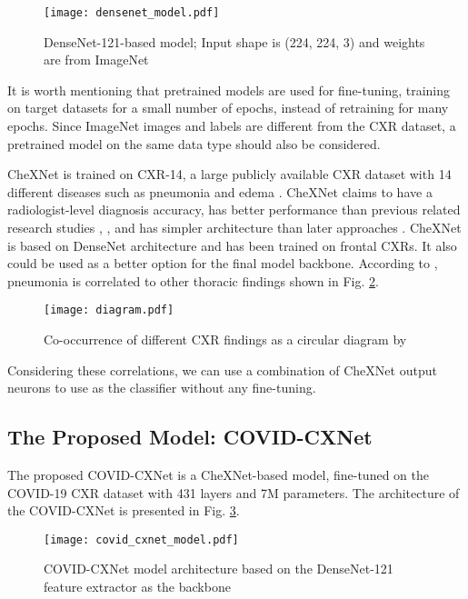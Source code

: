 \documentclass{article}
\begin{document}
\begin{figure}[H]
    \centering
    \texttt{[image: densenet\_model.pdf]}
    \caption{DenseNet-121-based model; Input shape is (224, 224, 3) and weights are from ImageNet}
    \label{fig:densenet}
\end{figure}

\noindent It is worth mentioning that pretrained models are used for fine-tuning, training on target datasets for a small number of epochs, instead of retraining for many epochs. Since ImageNet images and labels are different from the CXR dataset, a pretrained model on the same data type should also be considered.

CheXNet is trained on CXR-14, a large publicly available CXR dataset with 14 different diseases such as pneumonia and edema \cite{rajpurkar2017chexnet}. CheXNet claims to have a radiologist-level diagnosis accuracy, has better performance than previous related research studies \cite{wang2017chestx}, \cite{yao2017learning}, and has simpler architecture than later approaches \cite{ranjan2018jointly}. CheXNet is based on DenseNet architecture and has been trained on frontal CXRs. It also could be used as a better option for the final model backbone. According to \cite{wang2017chestx}, pneumonia is correlated to other thoracic findings shown in Fig. \ref{fig:thoracic_map}.

\begin{figure}[H]
    \centering
    \texttt{[image: diagram.pdf]}
    \caption{Co-occurrence of different CXR findings as a circular diagram by \cite{wang2017chestx}}
    \label{fig:thoracic_map}
\end{figure}

\noindent Considering these correlations, we can use a combination of CheXNet output neurons to use as the classifier without any fine-tuning.

\subsection{The Proposed Model: COVID-CXNet}
The proposed COVID-CXNet is a CheXNet-based model, fine-tuned on the COVID-19 CXR dataset with 431 layers and  7M parameters. The architecture of the COVID-CXNet is presented in Fig. \ref{fig:cxnet}.

\begin{figure}[H]
    \centering
    \texttt{[image: covid\_cxnet\_model.pdf]}
    \caption{COVID-CXNet model architecture based on the DenseNet-121 feature extractor as the backbone}
    \label{fig:cxnet}
\end{figure}
\end{document}
